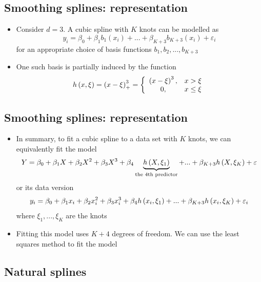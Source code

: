 \documentclass[]{article}
\providecommand{\tightlist}{%
  \setlength{\itemsep}{0pt}\setlength{\parskip}{0pt}}
\begin{document}
\subsection{Smoothing splines:
representation}\label{smoothing-splines-representation}

\begin{itemize}
\item
  Consider \(d=3\). A cubic spline with \(K\) knots can be modelled as
  \[
  y_{i}=\beta_{0}+\beta_{1}b_{1}\left(  x_{i}\right)  +...+\beta_{K+3}b_{K+3}\left(  x_{i}\right)  +\varepsilon_{i}
  \] for an appropriate choice of basis functions
  \(b_{1},b_{2},...,b_{K+3}\)
\item
  One such basis is partially induced by the function \[
  h\left(  x,\xi\right)  =\left(  x-\xi\right)  _{+}^{3}=\left\{
  \begin{array}
  [c]{cc}%
  \left(  x-\xi\right)  ^{3}, & x>\xi\\
  0, & x\leq\xi
  \end{array}
  \right.
  \]
\end{itemize}

\subsection{Smoothing splines:
representation}\label{smoothing-splines-representation-1}

\begin{itemize}
\tightlist
\item
  In summary, to fit a cubic spline to a data set with \(K\) knots, we
  can equivalently fit the model \[
  Y=\beta_{0}+\beta_{1}X+\beta_{2}X^{2}+\beta_{3}X^{3}+\\
   \beta_{4}%
  \underbrace{h\left(  X,\xi_{1}\right)  }_{\text{the 4th predictor}}%
  +...+\beta_{K+3}h\left(  X,\xi_{K}\right)  +\varepsilon
  \] or its data version \[
  y_{i}=\beta_{0}+\beta_{1}x_{i}+\beta_{2}x_{i}^{2}+\beta_{3}x_{i}^{3}+\\
  \beta_{4}h\left(  x_{i},\xi_{1}\right)  +...+\beta_{K+3}h\left(  x_{i},\xi
  _{K}\right)  +\varepsilon_{i}
  \] where \(\xi_{1},...,\xi_{K}\) are the knots
\item
  Fitting this model uses \(K+4\) degrees of freedom. We can use the
  least squares method to fit the model
\end{itemize}

\subsection{Natural splines}\label{natural-splines}
\end{document}
